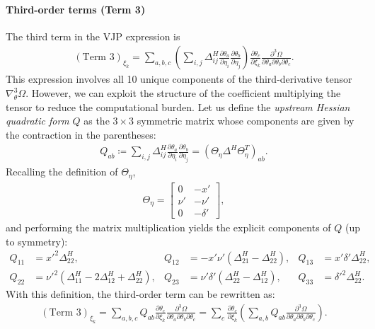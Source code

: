 \documentclass{article}
\begin{document}
\paragraph{Third-order terms (Term 3)}

The third term in the VJP expression is
%
\begin{align}
  (\text{Term 3})_{\xi_k} = \sum_{a,b,c} \left( \sum_{i,j} \Delta^H_{ij} \frac{\partial \theta_a}{\partial \eta_i} \frac{\partial \theta_b}{\partial \eta_j} \right) \frac{\partial \theta_c}{\partial \xi_k} \frac{\partial^3 \Omega}{\partial \theta_a \partial \theta_b \partial \theta_c}.
\end{align}
%
This expression involves all 10 unique components of the third-derivative tensor $\nabla_\theta^3 \Omega$.
However, we can exploit the structure of the coefficient multiplying the tensor to reduce the computational burden.
Let us define the \textit{upstream Hessian quadratic form} $Q$ as the $3 \times 3$ symmetric matrix whose components are given by the contraction in the parentheses:
%
\begin{align}
  Q_{ab} \coloneqq \sum_{i,j} \Delta^H_{ij} \frac{\partial \theta_a}{\partial \eta_i} \frac{\partial \theta_b}{\partial \eta_j} = (\Theta_\eta \Delta^H \Theta_\eta^T)_{ab}.
\end{align}
%
Recalling the definition of $\Theta_\eta$,
\begin{align}
  \Theta_{\eta} =
  \begin{bmatrix}
    0    & -x'      \\
    \nu' & -\nu'    \\
    0    & -\delta'
  \end{bmatrix},
\end{align}
%
and performing the matrix multiplication yields the explicit components of $Q$ (up to symmetry):
%
\begin{align}
  Q_{11} & = x'^2 \Delta^H_{22},                                      & Q_{12} & = -x' \nu' (\Delta^H_{21} - \Delta^H_{22}),     & Q_{13} & = x' \delta' \Delta^H_{22}, \\
  Q_{22} & = \nu'^2 (\Delta^H_{11} - 2\Delta^H_{12} + \Delta^H_{22}), & Q_{23} & = \nu' \delta' (\Delta^H_{22} - \Delta^H_{12}), & Q_{33} & = \delta'^2 \Delta^H_{22}.
\end{align}
%
With this definition, the third-order term can be rewritten as:
%
\begin{align}
  (\text{Term 3})_{\xi_k} = \sum_{a,b,c} Q_{ab} \frac{\partial \theta_c}{\partial \xi_k} \frac{\partial^3 \Omega}{\partial \theta_a \partial \theta_b \partial \theta_c} = \sum_c \frac{\partial \theta_c}{\partial \xi_k} \left( \sum_{a,b} Q_{ab} \frac{\partial^3 \Omega}{\partial \theta_a \partial \theta_b \partial \theta_c} \right).
\end{align}
\end{document}
